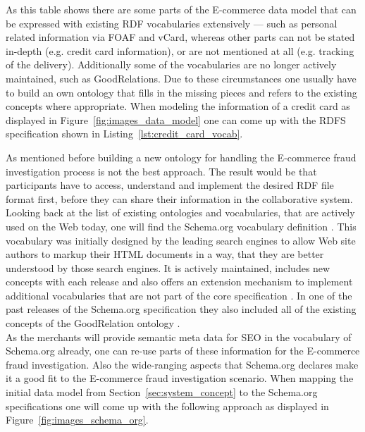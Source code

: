 As this table shows there are some parts of the \gls{E-commerce} data model that can be expressed with existing \gls{RDF} vocabularies extensively --- such as personal related information via \gls{FOAF} and \gls{vCard}, whereas other parts can not be stated in-depth (e.g. credit card information), or are not mentioned at all (e.g. tracking of the delivery). Additionally some of the vocabularies are no longer actively maintained, such as GoodRelations. Due to these circumstances one usually have to build an own ontology that fills in the missing pieces and refers to the existing concepts where appropriate. When modeling the information of a credit card as displayed in Figure~\ref{fig:images_data_model} one can come up with the \gls{RDFS} specification shown in Listing~\ref{lst:credit_card_vocab}. \@


As mentioned before building a new ontology for handling the \gls{E-commerce} fraud investigation process is not the best approach. The result would be that participants have to access, understand and implement the desired \gls{RDF} file format first, before they can share their information in the collaborative system. Looking back at the list of existing ontologies and vocabularies, that are actively used on the Web today, one will find the Schema.org vocabulary definition \citep{Schema.org}. This vocabulary was initially designed by the leading search engines to allow Web site authors to markup their \gls{HTML} documents in a way, that they are better understood by those search engines. It is actively maintained, includes new concepts with each release and also offers an extension mechanism to implement additional vocabularies that are not part of the core specification \citep{SchemaExtensions}. In one of the past releases of the Schema.org specification they also included all of the existing concepts of the GoodRelation ontology \citep{SchemaGoodRelation}. \\

As the merchants will provide semantic meta data for \gls{SEO} in the vocabulary of Schema.org already, one can re-use parts of these information for the \gls{E-commerce} fraud investigation. Also the wide-ranging aspects that Schema.org declares make it a good fit to the \gls{E-commerce} fraud investigation scenario. When mapping the initial data model from Section~\ref{sec:system_concept} to the Schema.org specifications one will come up with the following approach as displayed in Figure~\ref{fig:images_schema_org}. \@

